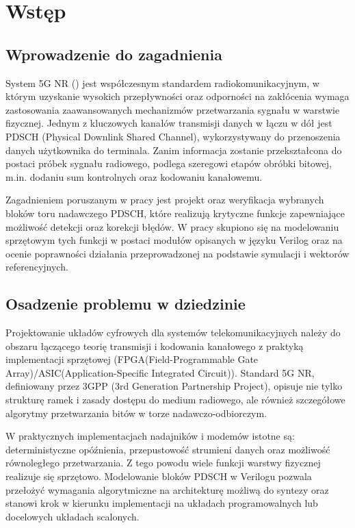 \chapter{Wstęp}
\label{ch:wstep}

\section{Wprowadzenie do zagadnienia}
\label{sec:wstep_wprowadzenie}
System 5G NR () jest współczesnym standardem radiokomunikacyjnym, w którym uzyskanie wysokich przepływności oraz odporności na zakłócenia wymaga zastosowania zaawansowanych mechanizmów przetwarzania sygnału w warstwie fizycznej. Jednym z kluczowych kanałów transmisji danych w łączu w dół jest PDSCH (Physical Downlink Shared Channel), wykorzystywany do przenoszenia danych użytkownika do terminala. Zanim informacja zostanie przekształcona do postaci próbek sygnału radiowego, podlega szeregowi etapów obróbki bitowej, m.in. dodaniu sum kontrolnych oraz kodowaniu kanałowemu.

Zagadnieniem poruszanym w pracy jest projekt oraz weryfikacja wybranych bloków toru nadawczego PDSCH, które realizują krytyczne funkcje zapewniające możliwość detekcji oraz korekcji błędów. W pracy skupiono się na modelowaniu sprzętowym tych funkcji w postaci modułów opisanych w języku Verilog oraz na ocenie poprawności działania przeprowadzonej na podstawie symulacji i wektorów referencyjnych.

\section{Osadzenie problemu w dziedzinie}
\label{sec:wstep_osadzenie}
Projektowanie układów cyfrowych dla systemów telekomunikacyjnych należy do obszaru łączącego teorię transmisji i kodowania kanałowego z praktyką implementacji sprzętowej (FPGA(Field-Programmable Gate Array)/ASIC(Application-Specific Integrated Circuit)). Standard 5G NR, definiowany przez 3GPP (3rd Generation Partnership Project), opisuje nie tylko strukturę ramek i zasady dostępu do medium radiowego, ale również szczegółowe algorytmy przetwarzania bitów w torze nadawczo-odbiorczym.

W praktycznych implementacjach nadajników i modemów istotne są: deterministyczne opóźnienia, przepustowość strumieni danych oraz możliwość równoległego przetwarzania. Z tego powodu wiele funkcji warstwy fizycznej realizuje się sprzętowo. Modelowanie bloków PDSCH w Verilogu pozwala przełożyć wymagania algorytmiczne na architekturę możliwą do syntezy oraz stanowi krok w kierunku implementacji na układach programowalnych lub docelowych układach scalonych.

